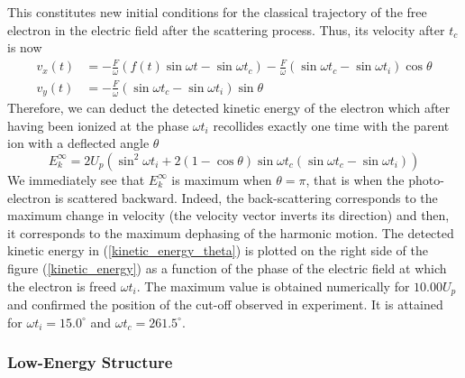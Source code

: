 \documentclass[a4paper]{article}
\begin{document}
This constitutes new initial conditions for the classical trajectory of the free electron in the electric field after the scattering process. Thus, its velocity after $t_{c}$ is now
\begin{align}
v_{x}(t)&=-\frac{F}{\omega} \left(f(t)\sin{\omega t}-\sin{\omega t_{c}} \right) - \frac{F}{\omega} \left( \sin{\omega t_{c}}-\sin{\omega t_{i}} \right) \cos{\theta} \\
v_{y}(t)&=-\frac{F}{\omega} \left( \sin{\omega t_{c}} - \sin{\omega t_{i}} \right) \sin{\theta}
\end{align}
Therefore, we can deduct the detected kinetic energy of the electron which after having been ionized at the phase $\omega t_{i}$ recollides exactly one time with the parent ion with a deflected angle $\theta$
\begin{equation}
E_{k}^{\infty}=2 U_{p} \left(\sin^{2}{\omega t_{i}}+2(1-\cos{\theta})\sin{\omega t_{c}} \left(\sin{\omega t_{c}}-\sin{\omega t_{i}}\right)\right)
\label{kinetic_energy_theta}
\end{equation}
We immediately see that $E_{k}^{\infty}$ is maximum when $\theta=\pi$, that is when the photo-electron is scattered backward. Indeed, the back-scattering corresponds to the maximum change in velocity (the velocity vector inverts its direction) and then, it corresponds to the maximum dephasing of the harmonic motion. The detected kinetic energy in (\ref{kinetic_energy_theta}) is plotted on the right side of the figure (\ref{kinetic_energy}) as a function of the phase of the electric field at which the electron is freed $\omega t_{i}$.
The maximum value is obtained numerically for $10.00 U_{p}$ and confirmed the position of the cut-off observed in experiment. It is attained for $\omega t_{i}=15.0^{\circ}$ and $\omega t_{c}=261.5^{\circ}$.




\subsubsection{Low-Energy Structure}
\end{document}
